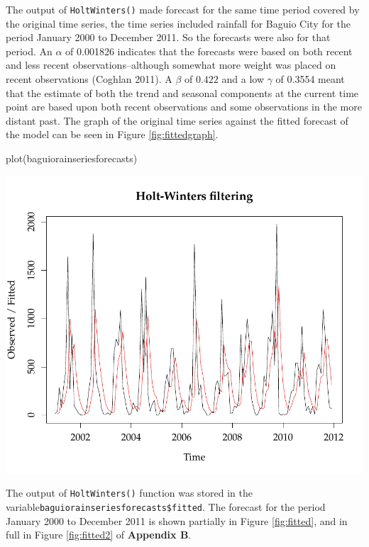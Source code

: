 The output of \texttt{HoltWinters()} made forecast for the same time period covered by the original time series, the time series included rainfall for Baguio City for the period January 2000 to December 2011. So the forecasts were also for that period. An $\alpha$ of 0.001826 indicates that the forecasts were based on both recent and less recent observations--although somewhat more weight was placed on recent observations (Coghlan 2011). A $\beta$ of $0.422$ and a low $\gamma$ of 0.3554 meant that the estimate
of both the trend and seasonal components at the current time point are based upon both recent
observations and some observations in the more distant past. The graph of the original time series against the fitted forecast of the model can be seen in Figure \eqref{fig:fittedgraph}.
\newpage
\begin{center}
\begin{Schunk}
\begin{Sinput}
plot(baguiorainseriesforecasts)
\end{Sinput}

\includegraphics[width=.7\textwidth]{figure/listings-fittedgraph} \end{Schunk}

\end{center}

The output of \texttt{HoltWinters()} function was stored in the variable\newline \texttt{baguiorainseriesforecasts\$fitted}. The forecast for the period January 2000 to December 2011 is shown partially in Figure \eqref{fig:fitted}, and in full in Figure \eqref{fig:fitted2} of \textbf{Appendix B}.

